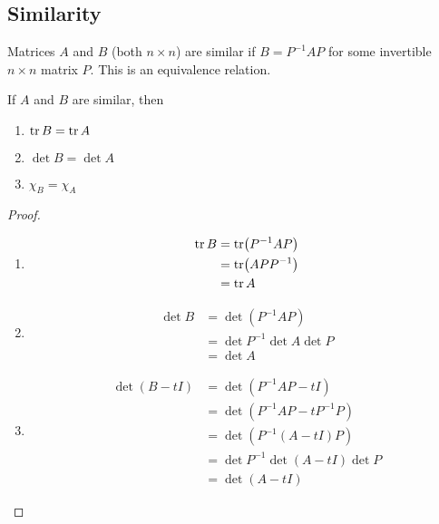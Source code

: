 \subsection{Similarity}
Matrices \(A\) and \(B\) (both \(n \times n\)) are similar if \(B = P^{-1}AP\) for some invertible \(n\times n\) matrix \(P\).
This is an equivalence relation.
\begin{proposition}
	If \(A\) and \(B\) are similar, then
	\begin{enumerate}
		\item \(\tr B = \tr A\)
		\item \(\det B = \det A\)
		\item \(\chi_B = \chi_A\)
	\end{enumerate}
\end{proposition}
\begin{proof}
	\begin{enumerate}
		\item \begin{align*}
			      \tr B & = \tr (P^{-1}AP) \\&= \tr(APP^{-1}) \\&= \tr A
		      \end{align*}
		\item \begin{align*}
			      \det B & = \det (P^{-1}AP) \\&= \det P^{-1} \det A \det P \\&= \det A
		      \end{align*}
		\item \begin{align*}
			      \det(B - tI) & = \det(P^{-1}AP - tI) \\&= \det(P^{-1}AP - tP^{-1}P) \\&= \det(P^{-1}(A - tI)P) \\&= \det P^{-1} \det(A - tI) \det P \\&= \det(A - tI)
		      \end{align*}
	\end{enumerate}
\end{proof}
